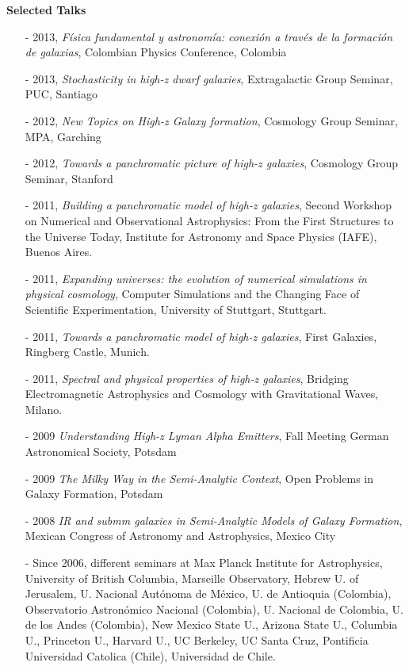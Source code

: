\documentclass[9pt]{article}
\begin{document}
{\bf Selected Talks}
\begin{itemize} 
\item [-] 2013, {\it F\'isica fundamental y astronom\'ia: conexi\'on a trav\'es de la formaci\'on de galaxias}, Colombian Physics Conference, Colombia
\item [-] 2013, {\it Stochasticity in high-z dwarf galaxies},
  Extragalactic Group Seminar, PUC, Santiago
\item [-] 2012, {\it New Topics on High-z Galaxy formation}, Cosmology
  Group Seminar, MPA, Garching 
\item [-] 2012, {\it Towards a panchromatic picture of high-z
  galaxies}, Cosmology Group Seminar, Stanford 
\item [-] 2011, {\it Building a panchromatic model of high-z
  galaxies}, Second Workshop on Numerical and Observational
  Astrophysics: From the First Structures to the Universe Today,
  Institute for Astronomy and Space Physics (IAFE), Buenos Aires. 
\item [-] 2011, {\it Expanding universes: the evolution of numerical
  simulations in physical cosmology}, Computer Simulations and the
  Changing Face of Scientific Experimentation, University of
  Stuttgart, Stuttgart. 
\item [-] 2011, {\it Towards a panchromatic model of high-z galaxies}, First
  Galaxies, Ringberg Castle, Munich.  
\item [-] 2011, {\it Spectral and physical properties of high-z galaxies},
  Bridging Electromagnetic Astrophysics and Cosmology with Gravitational
  Waves, Milano.
\item [-] 2009 {\it Understanding High-z Lyman Alpha Emitters}, Fall
  Meeting German Astronomical Society, Potsdam 
\item [-] 2009 {\it The Milky Way in the Semi-Analytic Context}, Open
  Problems in Galaxy Formation, Potsdam 
\item [-] 2008 {\it IR and submm galaxies in Semi-Analytic Models of
  Galaxy Formation}, Mexican Congress of Astronomy and Astrophysics,
  Mexico City 
\item [-] Since 2006, different seminars at Max Planck Institute for
  Astrophysics, University of British Columbia, Marseille Observatory,
  Hebrew U. of Jerusalem, U. Nacional Aut\'onoma de M\'exico, U. de
  Antioquia (Colombia), Observatorio Astron\'omico Nacional
  (Colombia), U. Nacional de Colombia, U. de los Andes (Colombia), New
  Mexico State U., Arizona State U., Columbia U., Princeton U.,
  Harvard U., UC Berkeley, UC Santa Cruz, Pontificia Universidad
  Catolica (Chile), Universidad de Chile. 
\end{itemize}
\end{document}
